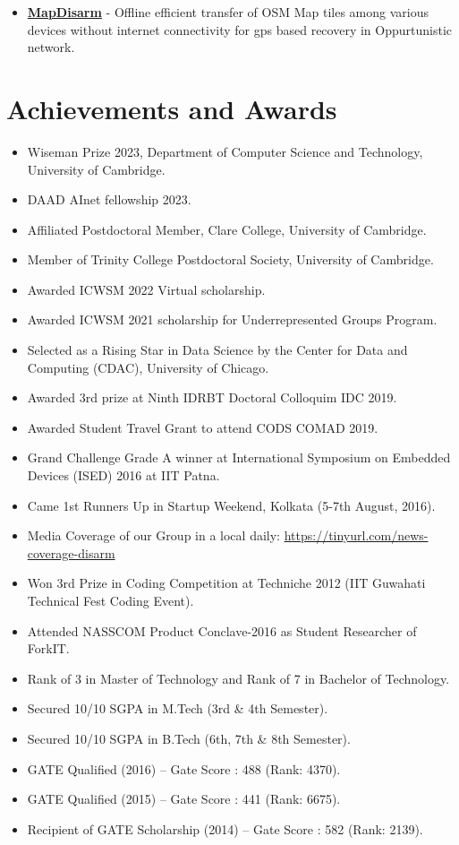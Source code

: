 \documentclass[margin, centered,lmodern]{res}
\begin{document}
\begin{resume}
\begin{itemize}[leftmargin=*]
 \item \textbf{\href{https://github.com/hridaydutta123/MapDisarm}{MapDisarm}} - Offline efficient transfer of OSM Map tiles among various devices without internet connectivity for gps based recovery in Oppurtunistic network.
\end{itemize}

\section{Achievements and Awards}
\begin{itemize}[leftmargin=*]
\item Wiseman Prize 2023, Department of Computer Science and Technology, University of Cambridge.
\item DAAD AInet fellowship 2023.
\item Affiliated Postdoctoral Member, Clare College, University of Cambridge.
\item Member of Trinity College Postdoctoral Society,  University of Cambridge.
 \item Awarded ICWSM 2022 Virtual scholarship.
 \item Awarded ICWSM 2021 scholarship for Underrepresented Groups Program.
 \item Selected as a Rising Star in Data Science by the Center for Data and Computing (CDAC), University of Chicago.
 \item Awarded 3rd prize at Ninth IDRBT Doctoral Colloquim IDC 2019.
 \item Awarded Student Travel Grant to attend CODS COMAD 2019.
 \item Grand Challenge Grade A winner at International Symposium on Embedded Devices (ISED) 2016 at IIT Patna.
 \item Came 1st Runners Up in Startup Weekend, Kolkata (5-7th August, 2016).
 \item Media Coverage of our Group in a local daily: \url{https://tinyurl.com/news-coverage-disarm}
 \item Won 3rd Prize in Coding Competition at Techniche 2012 (IIT Guwahati Technical Fest Coding Event).
 \item Attended NASSCOM Product Conclave-2016 as Student Researcher of ForkIT.
 \item Rank of 3 in Master of Technology and Rank of 7 in Bachelor of Technology.
 \item Secured 10/10 SGPA in M.Tech (3rd \& 4th Semester).
 \item Secured 10/10 SGPA in B.Tech (6th, 7th \& 8th Semester).
 \item GATE Qualified (2016) – Gate Score : 488 (Rank: 4370).
 \item GATE Qualified (2015) – Gate Score : 441 (Rank: 6675).
 \item Recipient of GATE Scholarship (2014) – Gate Score : 582 (Rank: 2139).


\end{itemize}
\end{resume}
\end{document}
